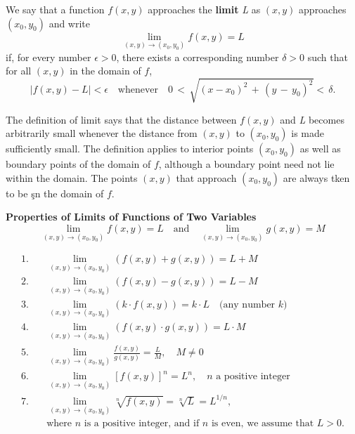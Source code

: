 \documentclass[12pt,a4paper]{article}
\newenvironment{definition}{\begin{definitionbox}}{\end{definitionbox}\vspace{1\baselineskip}}
\newenvironment{theorem}{\begin{theorembox}}{\end{theorembox}\vspace{1\baselineskip}}
\begin{document}
\begin{definition}
    We say that a function \(f(x,y)\) approaches the \textbf{limit} \textit{L} as \((x,y)\) approaches \((x_0,y_0)\) and write
    \[\lim_{(x,y) \to (x_0,y_0) } f(x,y) = L\]
    if, for every number \(\epsilon > 0\), there exists a corresponding number \(\delta > 0\) such that for all \((x,y)\) in the domain of \(f\),
     \[\left|f(x,y) -\mathit{L} \right| < \epsilon \quad \text{whenever} \quad 0\,<\,\sqrt{(x-x_{0})^{2}\,+\,(y\,-\,y_{0})^{2}}<\,\delta.\]
\end{definition}

The definition of limit says that the distance between \(f(x,y)\) and \textit{L} becomes arbitrarily small whenever the distance from \((x,y)\) to \((x_0,y_0)\) is made sufficiently small.
The definition applies to interior points \((x_0,y_0)\) as well as boundary points of the domain of \(f\), although a boundary point need not lie within the domain. The points \((x,y)\) that approach \((x_0,y_0)\) are always tken to be şn the domain of \(f\).

\begin{theorem}
    \textbf{Properties of Limits of Functions of Two Variables}
    \[\operatorname*{lim}_{(x,y)\rightarrow(x_{0},y_{0})} f(x,y) = L \quad \text{and} \quad \operatorname*{lim}_{(x,y)\rightarrow(x_{0},y_{0})} g(x,y) = M\]

    \begin{align*}
        1. & \quad \lim_{(x, y) \rightarrow (x_0, y_0)} (f(x, y) + g(x, y)) = L + M \\
        2. & \quad \lim_{(x, y) \rightarrow (x_0, y_0)} (f(x, y) - g(x, y)) = L - M \\
        3. & \quad \lim_{(x, y) \rightarrow (x_0, y_0)} (k \cdot f(x, y)) = k \cdot L \quad \text{(any number $k$)} \\
        4. & \quad \lim_{(x, y) \rightarrow (x_0, y_0)} (f(x, y) \cdot g(x, y)) = L \cdot M \\
        5. & \quad \lim_{(x, y) \rightarrow (x_0, y_0)} \frac{f(x, y)}{g(x, y)} = \frac{L}{M}, \quad M \neq 0 \\
        6. & \quad \lim_{(x, y) \rightarrow (x_0, y_0)} [f(x, y)]^n = L^n, \quad n \text{ a positive integer} \\
        7. & \quad \lim_{(x, y) \rightarrow (x_0, y_0)} \sqrt[n]{f(x, y)} = \sqrt[n]{L} = L^{1/n}, \\
        & \quad \text{where $n$ is a positive integer, and if $n$ is even, we assume that $L > 0$.}
        \end{align*}
        
\end{theorem}
\end{document}

